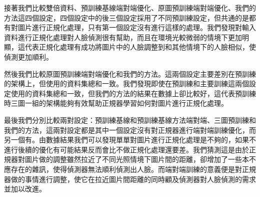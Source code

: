 接著我們比較雙倍資料、預訓練基線端對端優化、原圖預訓練端對端優化、我們的方法這四個設定，四個設定中的後三個設定採用了不同預訓練設定，但共通的是都有對圖片進行正規化處理，只有第一個設定沒有進行這樣的處理。我們發現對輸入資料進行正規化處理對人臉偵測很有幫助，而且在環境光較微弱的情境下更加明顯，這代表正規化處理有成功將圖片中的人臉調整到和其他情境下的人臉相似，使偵測更加順利。

然後我們比較原圖預訓練端對端優化和我們的方法。這兩個設定主要差別在預訓練的架構上，但使用的資料集總和一致。我們發現即使在預訓練和主要訓練這兩個設定使用的資料集總和一致，但我們的方法的結果在數據上卻比較好，這代表預訓練時三圖一組的架構能夠有效幫助正規器學習如何對圖片進行正規化處理。

最後我們分別比較兩對設定：預訓練基線和預訓練基線方法端對端、三圖預訓練和我們的方法，這兩對設定都是其中一個設定沒有對正規器進行端對端訓練優化，而另一個有。由數據結果我們可以發現單單對圖片進行正規化處理是不夠的，如果不進行後續的優化有可能結果反而會比不做正規化處理還要差。我們猜測這是由於正規器對圖片做的調整雖然拉近了不同光照情境下圖片間的距離，卻增加了一些本不應存在的雜訊，使得偵測器無法順利偵測出人臉。而端對端訓練的意義便是對正規器做的事情進行調整，使它在拉近圖片間距離的同時顧及偵測器對人臉偵測的需求並加以改進。
